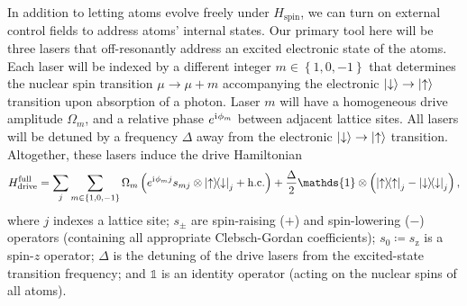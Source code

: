 \documentclass[nofootinbib,notitlepage,11pt]{revtex4-2}
\renewcommand{\t}{\text} %
\newcommand{\f}[2]{\dfrac{#1}{#2}} %
\newcommand{\p}[1]{\left(#1\right)} %
\renewcommand{\set}[1]{\left\{#1\right\}} %
\renewcommand{\i}{\mathrm{i}\mkern1mu} %
\newcommand{\1}{\mathds{1}}
\newcommand{\up}{\uparrow}
\newcommand{\dn}{\downarrow}
\newcommand{\z}{\text{z}}
\begin{document}
In addition to letting atoms evolve freely under $H_{\t{spin}}$, we can turn on external control fields to address atoms' internal states.
Our primary tool here will be three lasers that off-resonantly address an excited electronic state of the atoms.
Each laser will be indexed by a different integer $m\in\set{1,0,-1}$ that determines the nuclear spin transition $\mu\to\mu+m$ accompanying the electronic $\ket\dn\to\ket\up$ transition upon absorption of a photon.
Laser $m$ will have a homogeneous drive amplitude $\Omega_m$, and a relative phase $e^{\i\phi_m}$ between adjacent lattice sites.
All lasers will be detuned by a frequency $\Delta$ away from the electronic $\ket\dn\to\ket\up$ transition.
Altogether, these lasers induce the drive Hamiltonian
\begin{align}
  H_{\t{drive}}^{\t{full}} = \sum_j \sum_{m\in\set{1,0,-1}} \Omega_m
  \p{e^{\i\phi_m j} s_{mj} \otimes\op{\up}{\dn}_j + \t{h.c.}}
  + \f{\Delta}{2} \1 \otimes\p{\op\up_j-\op\dn_j},
  \label{eq:drive_full}
\end{align}
where $j$ indexes a lattice site; $s_\pm$ are spin-raising ($+$) and spin-lowering ($-$) operators (containing all appropriate Clebsch-Gordan coefficients); $s_0\coloneqq s_\z$ is a spin-$z$ operator; $\Delta$ is the detuning of the drive lasers from the excited-state transition frequency; and $\1$ is an identity operator (acting on the nuclear spins of all atoms).
\end{document}
